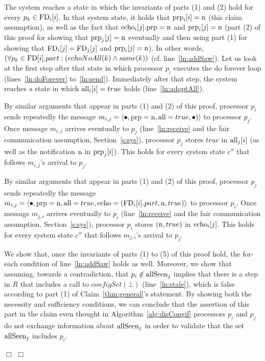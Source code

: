 \documentclass[11pt]{article}
\newcommand{\notif}{prp}
\newenvironment{proof}{\noindent{\bf Proof.}}{\hfill$\Box$}
\begin{document}
\begin{proof}
\begin{proof}
 The system reaches a state in which the invariants of parts (1) and (2) hold for every $p_k \in \textnormal{FD}_i[i]$. In that system state, it holds that $\textnormal{\notif}_i[i]=\textnormal{n}$ (this claim assumption), as well as the fact that  $\textnormal{echo}_i[j].\textnormal{\notif} = \textnormal{n}$ and $\textnormal{\notif}_i[j]=\textnormal{n}$ (part (2) of this proof for showing that $\textnormal{\notif}_j[j]=\textnormal{n}$ eventually and then using part (1) for showing that 
$\textnormal{FD}_i[j] = \textnormal{FD}_j[j]$ and $\textnormal{\notif}_i[j] = \textnormal{n}$). In other words, $(\forall {p_k \in \textnormal{FD}[i].part}:(echoNoAll(k) \land same(k))$
(cf. line~\ref{ln:addSaw}). 
Let us look at the first step after that state in which processor $p_i$ executes the do forever loop (lines~\ref{ln:doForever} to~\ref{ln:send}). Immediately after that step, the system reaches a state in which $\textnormal{all}_i[i]=true$ holds (line~\ref{ln:adoptAll}).

 By similar arguments that appear in parts (1) and (2) of this proof, processor $p_i$ sends repeatedly the message $m_{i,j} = \langle \bullet, \textnormal{\notif}=\textnormal{n}, \textnormal{all}=true, \bullet) \rangle$ to processor $p_j$. Once message $m_{i,j}$ arrives eventually to $p_j$ (line~\ref{ln:receive} and the fair communication assumption, Section~\ref{s:sys}), processor $p_j$ stores $true$ in $\textnormal{all}_j[i]$ (as well as the notification $\textnormal{n}$ in $\textnormal{\notif}_j[i]$). This holds for every system state $c''$ that follows $m_{i,j}$'s arrival to $p_j$. 

 By similar arguments that appear in parts (1) and (2) of this proof, processor $p_j$ sends repeatedly the message $m_{i,j} = \langle \bullet, \textnormal{\notif}=\textnormal{n}, \textnormal{all}=true, \textnormal{echo}=(\textnormal{FD}_i[i].part,\textnormal{n},true) \rangle$ to processor $p_i$. Once message $m_{j,i}$ arrives eventually to $p_i$ (line~\ref{ln:receive} and the fair communication assumption, Section~\ref{s:sys}), processor $p_i$ stores $(\textnormal{n},true)$ in $\textnormal{echo}_i[j]$. This holds for every system state $c''$ that follows $m_{j,i}$'s arrival to $p_j$. 

 We show that, once the invariants of parts (1) to (5) of this proof hold, the for-each condition of line~\ref{ln:addSaw} holds as well. Moreover, we show that assuming, towards a contradiction, that $p_i \notin \textnormal{allSeen}_j$ implies that there is a step in $R$ that includes a call to  $configSet(\bot)$ (line~\ref{ln:stale}), which is false according to part (1) of Claim~\ref{thm:general}'s statement. 
By showing both the necessity and sufficiency conditions, we can conclude that the assertion of this part in the claim even thought in Algorithm~\ref{alg:disCongif} processors $p_i$ and $p_j$ do not exchange  information about $\textnormal{allSeen}_j$ in order to validate that the set $\textnormal{allSeen}_j$ includes $p_i$. 


\end{proof}
\end{proof}
\end{document}
